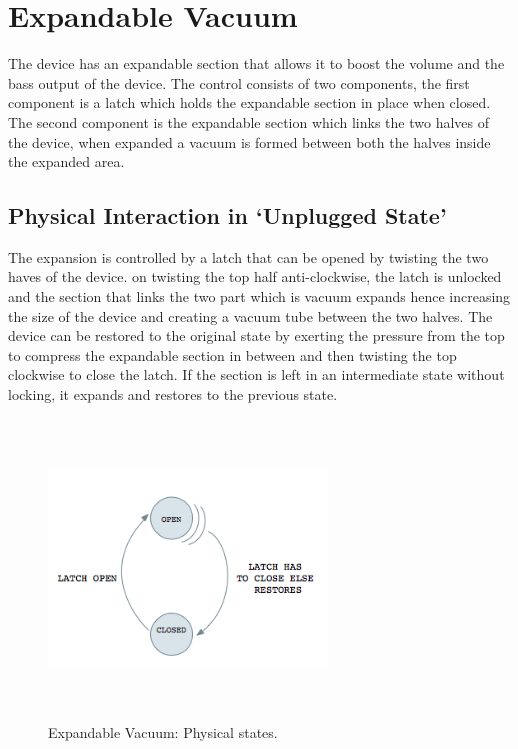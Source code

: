 \documentclass[10pt,a4paper]{article}
\begin{document}
\section{Expandable Vacuum}
The device has an expandable section that allows it to boost the volume and the bass output of the device. The control consists of two components, the first component is a latch which holds the expandable section in place when closed. The second component is the expandable section which links the two halves of the device, when expanded a vacuum is formed between both the halves inside the expanded area. 


\subsection{Physical Interaction in `Unplugged State'}

The expansion is controlled by a latch that can be opened by twisting the two haves of the device. on twisting the top half anti-clockwise, the latch is unlocked and the section that links the two part which is vacuum expands hence increasing the size of the device and creating a vacuum tube between the two halves. The device can be restored to the original state by exerting the pressure from the top to compress the expandable section in between and then twisting the top clockwise to close the latch. If the section is left in an intermediate state without locking, it expands and restores to the previous state.


\begin{figure}[hbpt]
\centerline{\includegraphics[width=280px,height=300px,keepaspectratio]{EV1}}
\caption {Expandable Vacuum: Physical states.}
\label{physical_state_power_switch}
\end{figure}
\end{document}
